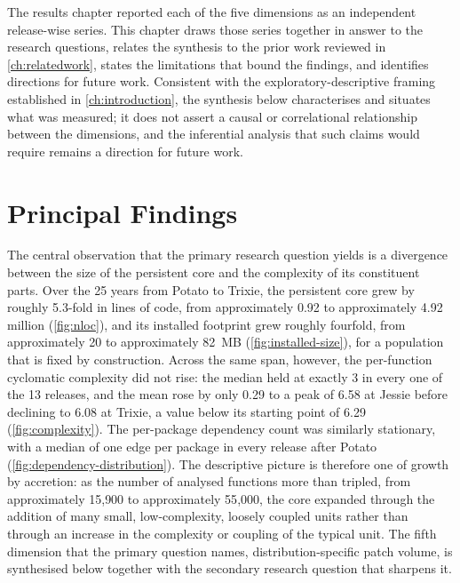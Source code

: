 The results chapter reported each of the five dimensions as an independent release-wise series. This chapter draws those series together in answer to the research questions, relates the synthesis to the prior work reviewed in \autoref{ch:relatedwork}, states the limitations that bound the findings, and identifies directions for future work. Consistent with the exploratory-descriptive framing established in \autoref{ch:introduction}, the synthesis below characterises and situates what was measured; it does not assert a causal or correlational relationship between the dimensions, and the inferential analysis that such claims would require remains a direction for future work.

\section{Principal Findings}
\label{sec:principal-findings}

The central observation that the primary research question yields is a divergence between the size of the persistent core and the complexity of its constituent parts. Over the 25 years from Potato to Trixie, the persistent core grew by roughly 5.3-fold in lines of code, from approximately 0.92 to approximately 4.92 million (\autoref{fig:nloc}), and its installed footprint grew roughly fourfold, from approximately 20 to approximately 82~MB (\autoref{fig:installed-size}), for a population that is fixed by construction. Across the same span, however, the per-function cyclomatic complexity did not rise: the median held at exactly 3 in every one of the 13 releases, and the mean rose by only 0.29 to a peak of 6.58 at Jessie before declining to 6.08 at Trixie, a value below its starting point of 6.29 (\autoref{fig:complexity}). The per-package dependency count was similarly stationary, with a median of one edge per package in every release after Potato (\autoref{fig:dependency-distribution}). The descriptive picture is therefore one of growth by accretion: as the number of analysed functions more than tripled, from approximately 15{,}900 to approximately 55{,}000, the core expanded through the addition of many small, low-complexity, loosely coupled units rather than through an increase in the complexity or coupling of the typical unit. The fifth dimension that the primary question names, distribution-specific patch volume, is synthesised below together with the secondary research question that sharpens it.

